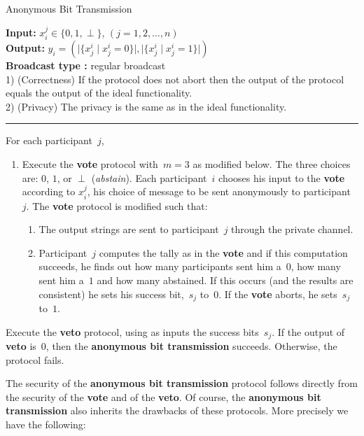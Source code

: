 \documentclass[11pt]{article}
\providecommand{\abs}[1]{\lvert#1\rvert}
\begin{document}
\begin{protocol}
\caption{Anonymous Bit Transmission} \label{prot:anon-bit-trans}
{\bf Input:} $ x^j_i \in \{0,1,\perp \}$, $(j=1,2,\ldots,n)$ \\
{\bf Output:} $y_i= ( \abs{\{x_j^i \mid x_j^i=0 \}} ,   \abs{\{x_j^i \mid x_j^i=1\} })$ \\
{\bf Broadcast type :}  regular broadcast\\
1) (Correctness) If the protocol does not abort then the output of
the protocol
equals the output of the ideal functionality.   \\
2) (Privacy) The privacy is the same as in the ideal functionality.

 \vspace{4pt} \hrule \vspace{4pt}

For each participant~$j$,
\begin{enumerate}
\item Execute the \textbf{vote} protocol with~$m=3$ as modified below. The three choices are: $0$, $1$, or
$\perp$ (\emph{abstain}). Each participant~$i$ chooses his input to
the \textbf{vote} according to $x^j_i$, his choice of message to be
sent anonymously to participant~$j$. The \textbf{vote} protocol is
modified such that:
\begin{enumerate}
\item \label{Anon:broadcast}The output strings are sent to participant~$j$
through the private channel.\item Participant~$j$ computes the tally
as in the \textbf{vote}  and if this computation succeeds, he finds
out how many participants sent him a~$0$, how many sent him a~$1$
and how many abstained. If this occurs (and the results are
consistent) he sets his success bit,~$s_j$ to~$0$. If the
\textbf{vote} aborts, he sets~$s_j$ to~$1$.
\end{enumerate}
\end{enumerate}
Execute the \textbf{veto} protocol, using as inputs the success
bits~$s_j$. If the output of \textbf{veto} is~$0$, then the
\textbf{anonymous bit transmission} succeeds. Otherwise, the
protocol fails.
\end{protocol}

The security of the \textbf{anonymous bit transmission} protocol
follows directly from the security of the \textbf{vote}  and
of the \textbf{veto}. Of course, the \textbf{anonymous bit
transmission} also inherits the drawbacks of these protocols. More
precisely we have the following:
\end{document}
